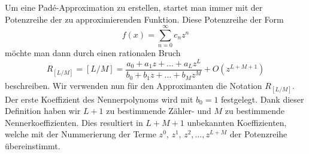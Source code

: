 Um eine Padé-Approximation zu erstellen, startet man immer mit der Potenzreihe der zu approximierenden Funktion.
Diese Potenzreihe der Form 
\begin{equation}
f(x)=\sum_{n=0}^{\infty} c_{n} z^{n} 
\end{equation} 
möchte man dann durch einen rationalen Bruch 
\begin{equation}
R_{[L/M]}
=
[L/M]
=
\frac{a_0 + a_1 z + \dots + a_L z^L}{b_0 + b_1 z + \dots + b_M z^M}
+O(z^{L+M+1})
\end{equation}
%
%
beschreiben.
Wir verwenden nun für den Approximanten die Notation $R_{[L/M]}$.
%
Der erste Koeffizient des Nennerpolynoms wird mit $b_0 = 1$ festgelegt.
%
Dank dieser Definition haben wir $L+1$ zu bestimmende Zähler- und $M$ zu bestimmende Nennerkoeffizienten. 
Dies resultiert in $L+M+1$ unbekannten Koeffizienten,
welche mit der Nummerierung der Terme $z^0$, $z^1$, $z^2,\dots , z^{L+M}$
der Potenzreihe übereinstimmt.

